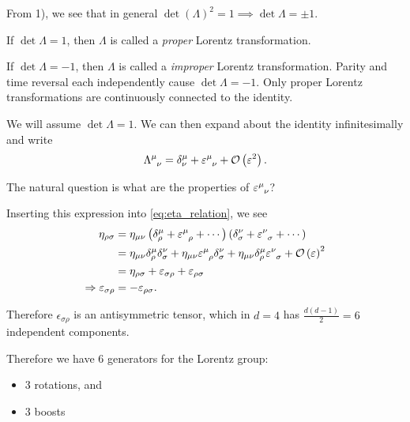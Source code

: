\begin{note}
    From 1), we see that in general $\det \left( \Lambda \right)^2 = 1 \implies \det \Lambda = \pm 1$.

    If $\det \Lambda = 1$, then $\Lambda$ is called a \textit{proper} Lorentz transformation.

    If $\det \Lambda = - 1$, then $\Lambda$ is called a \textit{improper} Lorentz transformation. Parity and time reversal each independently cause $\det \Lambda = - 1$. Only proper Lorentz transformations are continuously connected to the identity.
\end{note}

We will assume $\det \Lambda = 1$. We can then expand about the identity infinitesimally and write
\begin{align}
    \tensor{\Lambda}{^{\mu}_\nu} = \delta^{\mu}_\nu + \tensor{\epsilon}{^{\mu}_\nu}  + \mathcal{O}\left( \epsilon^2 \right) 
.\end{align}

The natural question is what are the properties of $\tensor{\epsilon}{^{\mu}_\nu}$?

Inserting this expression into \cref{eq:eta_relation}, we see
\begin{align}
    \eta_{\rho \sigma} &= \eta_{\mu \nu} \left( \delta^{\mu}_\rho + \tensor{\epsilon}{^{\mu}_\rho} + \cdots \right)  \left( \delta^{\nu}_{\sigma} + \tensor{\epsilon}{^{\nu}_{\sigma}} + \cdots \right) \nonumber  \\
    &= \eta_{\mu \nu} \delta^{\mu}_{\rho} \delta^{\nu}_{\sigma} + \eta_{\mu \nu} \tensor{\epsilon}{^{\mu}_\rho} \delta^{\nu}_{\sigma} + \eta_{\mu \nu} \delta^{\mu}_{\rho} \tensor{\epsilon}{^{\nu}_{\sigma}} + \mathcal{O} \left( \epsilon \right)^2  \nonumber \\
    &= \eta_{\rho \sigma} + \epsilon_{\sigma \rho} + \epsilon_{\rho \sigma} \nonumber \\
    \implies \epsilon_{\sigma \rho} &= - \epsilon_{\rho \sigma}
.\end{align}

Therefore $\epsilon_{\sigma \rho}$ is an antisymmetric tensor, which in $d= 4$ has $\frac{d \left( d - 1 \right) }{2} = 6$ independent components.

Therefore we have $6$ generators for the Lorentz group:
\begin{itemize}
    \item 3 rotations, and
    \item 3 boosts
\end{itemize}

